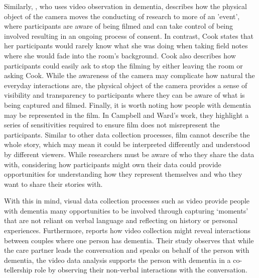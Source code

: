 Similarly, \cite{cook2002using}, who uses video observation in dementia, describes how the physical object of the camera moves the conducting of research to more of an 'event', where participants are aware of being filmed and can take control of being involved resulting in an ongoing process of consent. In contrast, Cook states that her participants would rarely know what she was doing when taking field notes where she would fade into the room's background. Cook also describes how participants could easily ask to stop the filming by either leaving the room or asking Cook. While the awareness of the camera may complicate how natural the everyday interactions are, the physical object of the camera provides a sense of visibility and transparency to participants where they can be aware of what is being captured and filmed. Finally, it is worth noting how people with dementia may be represented in the film. In Campbell and Ward's work, they highlight a series of sensitivities required to ensure film does not misrepresent the participants. Similar to other data collection processes, film cannot describe the whole story, which may mean it could be interpreted differently and understood by different viewers. While researchers must be aware of who they share the data with, considering how participants might own their data could provide opportunities for understanding how they represent themselves and who they want to share their stories with.

With this in mind, visual data collection processes such as video provide people with dementia many opportunities to be involved through capturing `moments' that are not reliant on verbal language and reflecting on history or personal experiences. Furthermore, \cite{majlesi2017video} reports how video collection might reveal interactions between couples where one person has dementia. Their study observes that while the care partner leads the conversation and speaks on behalf of the person with dementia, the video data analysis supports the person with dementia in a co-tellership role by observing their non-verbal interactions with the conversation.

